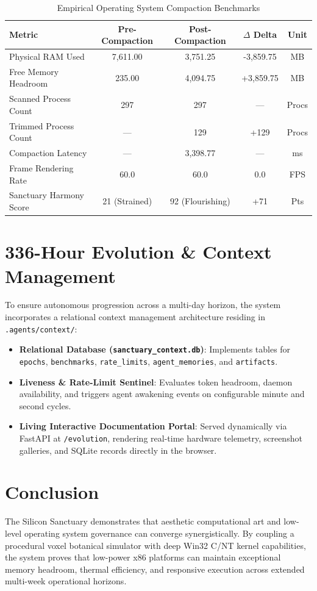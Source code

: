 \documentclass[11pt,a4paper]{article}
\begin{document}
\begin{table}[h]
\centering
\caption{Empirical Operating System Compaction Benchmarks}
\label{tab:benchmarks}
\begin{tabular}{@{}lcccc@{}}
\toprule
\textbf{Metric} & \textbf{Pre-Compaction} & \textbf{Post-Compaction} & \textbf{$\Delta$ Delta} & \textbf{Unit} \\
\midrule
Physical RAM Used & 7,611.00 & 3,751.25 & -3,859.75 & MB \\
Free Memory Headroom & 235.00 & 4,094.75 & +3,859.75 & MB \\
Scanned Process Count & 297 & 297 & --- & Procs \\
Trimmed Process Count & --- & 129 & +129 & Procs \\
Compaction Latency & --- & 3,398.77 & --- & ms \\
Frame Rendering Rate & 60.0 & 60.0 & 0.0 & FPS \\
Sanctuary Harmony Score & 21 (Strained) & 92 (Flourishing) & +71 & Pts \\
\bottomrule
\end{tabular}
\end{table}

\section{336-Hour Evolution \& Context Management}
To ensure autonomous progression across a multi-day horizon, the system incorporates a relational context management architecture residing in \texttt{.agents/context/}:
\begin{itemize}
    \item \textbf{Relational Database (\texttt{sanctuary\_context.db})}: Implements tables for \texttt{epochs}, \texttt{benchmarks}, \texttt{rate\_limits}, \texttt{agent\_memories}, and \texttt{artifacts}.
    \item \textbf{Liveness \& Rate-Limit Sentinel}: Evaluates token headroom, daemon availability, and triggers agent awakening events on configurable minute and second cycles.
    \item \textbf{Living Interactive Documentation Portal}: Served dynamically via FastAPI at \texttt{/evolution}, rendering real-time hardware telemetry, screenshot galleries, and SQLite records directly in the browser.
\end{itemize}

\section{Conclusion}
The Silicon Sanctuary demonstrates that aesthetic computational art and low-level operating system governance can converge synergistically. By coupling a procedural voxel botanical simulator with deep Win32 C/NT kernel capabilities, the system proves that low-power x86 platforms can maintain exceptional memory headroom, thermal efficiency, and responsive execution across extended multi-week operational horizons.
\end{document}
